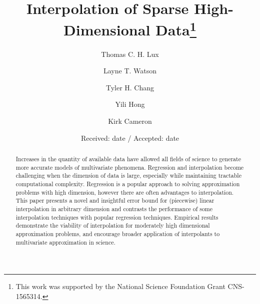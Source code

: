 \documentclass[smallextended,final]{svjour3}  %
\begin{document}
\title{Interpolation of Sparse High-Dimensional Data\thanks
  {This work was supported by the National Science Foundation Grant CNS-1565314.}
}

\author{Thomas C. H. Lux   \and
  Layne T. Watson          \and
  Tyler H. Chang           \and
  Yili Hong                \and
  Kirk Cameron
}



\date{Received: date / Accepted: date}

\maketitle

\begin{abstract}
Increases in the quantity of available data have allowed all fields of
science to generate more accurate models of multivariate phenomena.
Regression and interpolation become challenging when the dimension of
data is large, especially while maintaining tractable computational
complexity. Regression is a popular approach to solving approximation
problems with high dimension, however there are often advantages to
interpolation. This paper presents a novel and insightful error bound
for (piecewise) linear interpolation in arbitrary dimension and
contrasts the performance of some interpolation techniques with
popular regression techniques. Empirical results demonstrate the
viability of interpolation for moderately high dimensional
approximation problems, and encourage broader application of
interpolants to multivariate approximation in science.

\end{abstract}


\end{document}
